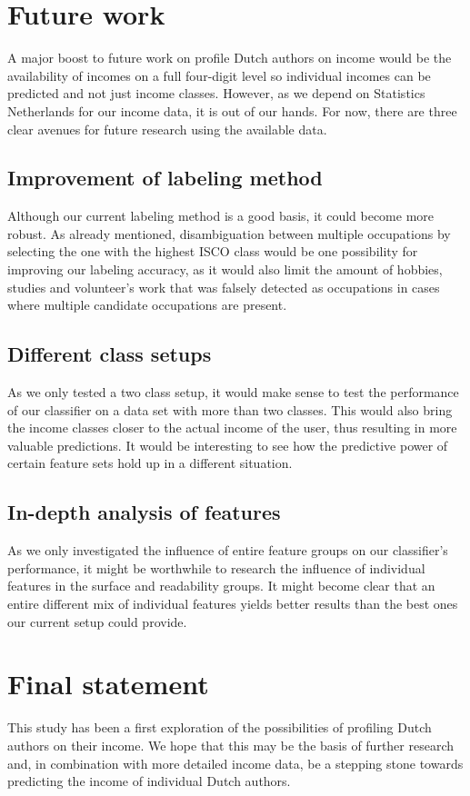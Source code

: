 \documentclass[
10pt, %
a4paper, %
oneside, %
headinclude,footinclude, %
] {book}%
\begin{document}
\section{Future work}
\label{futurework}
A major boost to future work on profile Dutch authors on income would be the availability of incomes on a full four-digit level so individual incomes can be predicted and not just income classes. However, as we depend on Statistics Netherlands for our income data, it is out of our hands. For now, there are three clear avenues for future research using the available data.

\subsection{Improvement of labeling method}
Although our current labeling method is a good basis, it could become more robust. As already mentioned, disambiguation between multiple occupations by selecting the one with the highest ISCO class would be one possibility for improving our labeling accuracy, as it would also limit the amount of hobbies, studies and volunteer's work that was falsely detected as occupations in cases where multiple candidate occupations are present.

\subsection{Different class setups}
As we only tested a two class setup, it would make sense to test the performance of our classifier on a data set with more than two classes. This would also bring the income classes closer to the actual income of the user, thus resulting in more valuable predictions. It would be interesting to see how the predictive power of certain feature sets hold up in a different situation.

\subsection{In-depth analysis of features}
As we only investigated the influence of entire feature groups on our classifier's performance, it might be worthwhile to research the influence of individual features in the surface and readability groups. It might become clear that an entire different mix of individual features yields better results than the best ones our current setup could provide.

\section{Final statement}
This study has been a first exploration of the possibilities of profiling Dutch authors on their income. We hope that this may be the basis of further research and, in combination with more detailed income data, be a stepping stone towards predicting the income of individual Dutch authors. 
\end{document}
